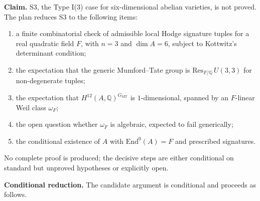\documentclass{article}
\begin{document}
\noindent\textbf{Claim.} S3, the Type I(3) case for six-dimensional abelian varieties, is not proved. The plan reduces S3 to the following items:
\begin{enumerate}
  \item[(i)] a finite combinatorial check of admissible local Hodge signature tuples for a real quadratic field $F$, with $n=3$ and $\dim A=6$, subject to Kottwitz's determinant condition;
  \item[(ii)] the expectation that the generic Mumford--Tate group is $\mathrm{Res}_{F/\mathbb{Q}}\, U(3,3)$ for non-degenerate tuples;
  \item[(iii)] the expectation that $H^{12}(A,\mathbb{Q})^{G_{\mathrm{MT}}}$ is $1$-dimensional, spanned by an $F$-linear Weil class $\omega_F$;
  \item[(iv)] the open question whether $\omega_F$ is algebraic, expected to fail generically;
  \item[(v)] the conditional existence of $A$ with $\mathrm{End}^0(A)=F$ and prescribed signatures.
\end{enumerate}
No complete proof is produced; the decisive steps are either conditional on standard but unproved hypotheses or explicitly open.

\medskip

\noindent\textbf{Conditional reduction.} The candidate argument is conditional and proceeds as follows.
\end{document}
